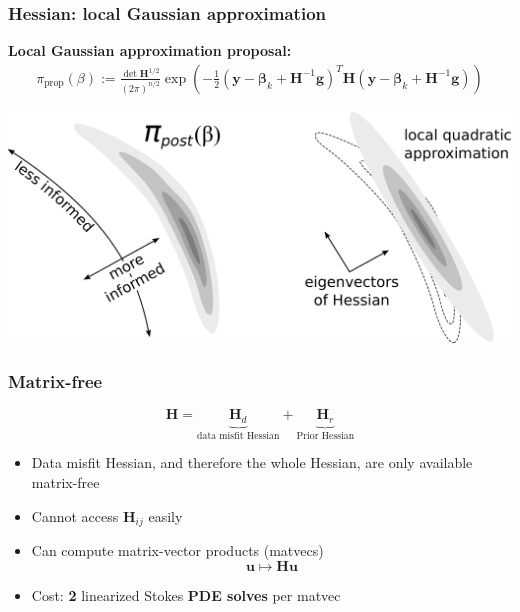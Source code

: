 \documentclass[10pt,final,xcolor=dvipsnames]{beamer}
\newcommand{\bs}[1]{\ensuremath{\boldsymbol{#1}}}
\begin{document}
\begin{frame}
  \frametitle{Hessian: local Gaussian approximation}
  
  \newcommand{\proposal}{\bs y}
  \newcommand{\params}{\bs m}
  
  \textbf{Local Gaussian approximation proposal:}
  \begin{align*}
  \pi_\text{prop}(\beta) := \frac { \det \bs H^{1/2} }{(2\pi)^{n/2} }
  \exp \left( - \frac 12 \left( \proposal - \bs{\beta}_k + \bs H^{-1} \bs
  g \right) ^T \bs H \left( \proposal - \bs{\beta}_k + \bs H^{-1} \bs g \right)
  \right)
  \end{align*}
  
  \vspace{0.25cm}

  \begin{center}
  \includegraphics[scale=0.25]{informed_uninformed_modes_combined.pdf}
  \end{center}
\end{frame}
\begin{frame}
	\frametitle{Matrix-free}
	
	$$\mathbf{H} = \underbrace{\mathbf{H}_d}_{\text{data misfit Hessian}} + \underbrace{\mathbf{H}_r}_\text{Prior Hessian}$$
	
	\begin{itemize}
		\setlength\itemsep{2em}
		\item Data misfit Hessian, and therefore the whole Hessian, are only available matrix-free
		\item Cannot access $\mathbf{H}_{ij}$ easily
		\item Can compute matrix-vector products (matvecs)
		$$\mathbf{u} \mapsto \mathbf{H} \mathbf{u}$$
		\item Cost: \textbf{2} linearized Stokes \textbf{PDE solves} per matvec
	\end{itemize}
	
\end{frame}
\end{document}
